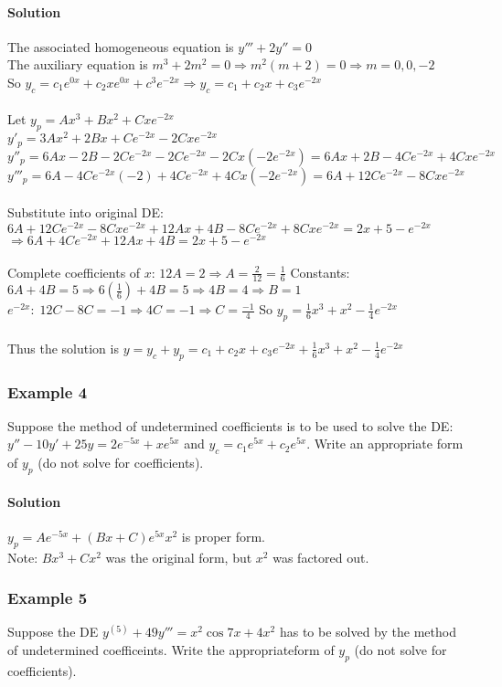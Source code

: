 \documentclass{article}
\begin{document}
\paragraph{Solution} The associated homogeneous equation is $y'''+2y''=0$
\\The auxiliary equation is $m^3+2m^2=0\Rightarrow m^2(m+2)=0\Rightarrow m=0,0,-2$
\\So $y_c=c_1e^{0x}+c_2xe^{0x}+c^3e^{-2x}\Rightarrow y_c=c_1+c_2x+c_3e^{-2x}$
\\\\Let $y_p=Ax^3+Bx^2+Cxe^{-2x}$
\\$y'_p=3Ax^2+2Bx+Ce^{-2x}-2Cxe^{-2x}$
\\$y''_p=6Ax-2B-2Ce^{-2x}-2Ce^{-2x}-2Cx(-2e^{-2x})=6Ax+2B-4Ce^{-2x}+4Cxe^{-2x}$
\\$y'''_p=6A-4Ce^{-2x}(-2)+4Ce^{-2x}+4Cx(-2e^{-2x})=6A+12Ce^{-2x}-8Cxe^{-2x}$
\\\\Substitute into original DE: $6A+12Ce^{-2x}-8Cxe^{-2x}+12Ax+4B-8Ce^{-2x}+8Cxe^{-2x}=2x+5-e^{-2x}$
\\$\Rightarrow 6A+4Ce^{-2x}+12Ax+4B=2x+5-e^{-2x}$
\\\\Complete coefficients of $x$: $12A=2\Rightarrow A=\frac{2}{12}=\frac{1}{6}$
\newpage Constants: $6A+4B=5\Rightarrow 6(\frac{1}{6})+4B=5\Rightarrow4B=4\Rightarrow B=1$
\\$e^{-2x}:\;12C-8C=-1\Rightarrow 4C=-1\Rightarrow C=\frac{-1}{4}$
So $y_p=\frac{1}{6}x^3+x^2-\frac{1}{4}e^{-2x}$
\\\\Thus the solution is $y=y_c+y_p=c_1+c_2x+c_3e^{-2x}+\frac{1}{6}x^3+x^2-\frac{1}{4}e^{-2x}$

\subsubsection{Example 4}
Suppose the method of undetermined coefficients is to be used to solve the DE: $y''-10y'+25y=2e^{-5x}+xe^{5x}$ and $y_c=c_1e^{5x}+c_2e^{5x}$.
Write an appropriate form of $y_p$ (do not solve for coefficients).
\paragraph{Solution} $y_p=Ae^{-5x}+(Bx+C)e^{5x}x^2$ is proper form.
\\Note: $Bx^3+Cx^2$ was the original form, but $x^2$ was factored out.

\subsubsection{Example 5}
Suppose the DE $y^{(5)}+49y'''=x^2\cos{7x}+4x^2$ has to be solved by the method of undetermined coefficeints. Write the appropriateform of $y_p$ (do not solve for coefficients).
\end{document}
